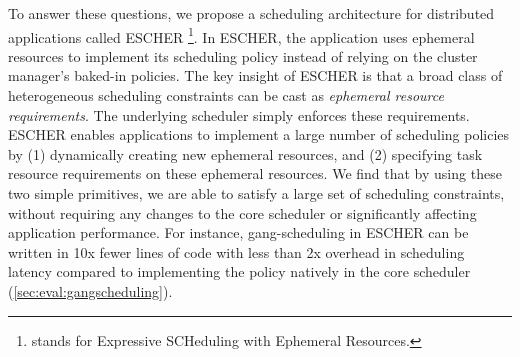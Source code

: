 To answer these questions, we propose a scheduling architecture for distributed applications called ESCHER \footnote{\name{} stands for Expressive SCHeduling with Ephemeral Resources.}.
In ESCHER, the application uses ephemeral resources to implement its scheduling policy instead of relying on the cluster manager's baked-in policies.
The key insight of ESCHER is that a broad class of heterogeneous scheduling constraints can be cast as \emph{ephemeral resource requirements}. The underlying scheduler simply enforces these requirements. ESCHER enables applications to implement a large number of scheduling policies by (1) dynamically creating new ephemeral resources, and (2) specifying task resource requirements on these ephemeral resources. We find that by using these two simple primitives, we are able to satisfy a large set of scheduling constraints, without requiring any changes to the core scheduler or significantly affecting application performance. For instance, gang-scheduling in ESCHER can be written in 10x fewer lines of code with less than 2x overhead in scheduling latency compared to implementing the policy natively in the core scheduler (\cref{sec:eval:gangscheduling}).


